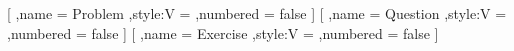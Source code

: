         [
            ,name = Problem
            ,style:V = \purplebox
            ,numbered = false
        ]
        [
            ,name = Question
            ,style:V = \purplebox
            ,numbered = false
        ]
        [
            ,name = Exercise
            ,style:V = \purplebox
            ,numbered = false
        ]



